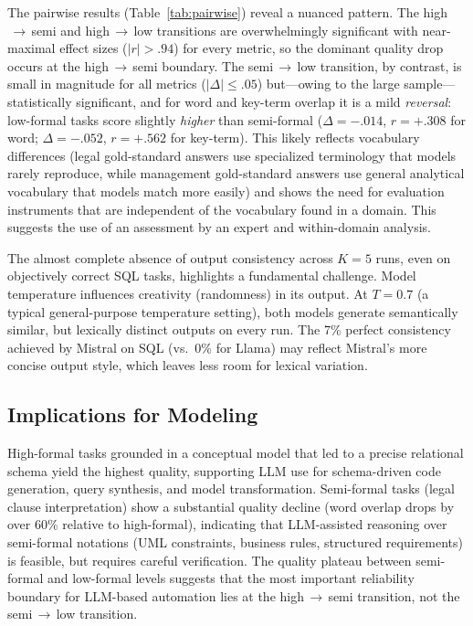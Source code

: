 \documentclass[runningheads]{llncs}
\begin{document}
The pairwise results (Table~\ref{tab:pairwise}) reveal a nuanced pattern. The high$\,\to\,$semi and high$\,\to\,$low transitions are overwhelmingly significant with near-maximal effect sizes ($|r| > .94$) for every metric, so the dominant quality drop occurs at the high$\,\to\,$semi boundary. The semi$\,\to\,$low transition, by contrast, is small in magnitude for all metrics ($|\Delta| \leq .05$) but---owing to the large sample---statistically significant, and for word and key-term overlap it is a mild \emph{reversal}: low-formal tasks score slightly \emph{higher} than semi-formal ($\Delta = -.014$, $r = +.308$ for word; $\Delta = -.052$, $r = +.562$ for key-term). This likely reflects vocabulary differences (legal gold-standard answers use specialized terminology that models rarely reproduce, while management gold-standard answers use general analytical vocabulary that models match more easily) and shows the need for evaluation instruments that are independent of the vocabulary found in a domain. This suggests the use of an assessment by an expert and within-domain analysis.

The almost complete absence of output consistency across $K\!=\!5$ runs, even on objectively correct SQL tasks, highlights a fundamental challenge. Model temperature influences creativity (randomness) in its output. At $T\!=\!0.7$ (a typical general-purpose temperature setting), both models generate semantically similar, but lexically distinct outputs on every run. The 7\% perfect consistency achieved by Mistral on SQL (vs.\ 0\% for Llama) may reflect Mistral's more concise output style, which leaves less room for lexical variation.

\subsection{Implications for Modeling}

High-formal tasks grounded in a conceptual model that led to a precise relational schema yield the highest quality, supporting LLM use for schema-driven code generation, query synthesis, and model transformation. Semi-formal tasks (legal clause interpretation) show a substantial quality decline (word overlap drops by over 60\% relative to high-formal), indicating that LLM-assisted reasoning over semi-formal notations (UML constraints, business rules, structured requirements) is feasible, but requires careful verification. The quality plateau between semi-formal and low-formal levels suggests that the most important reliability boundary for LLM-based automation lies at the high$\,\to\,$semi transition, not the semi$\,\to\,$low transition.
\end{document}
